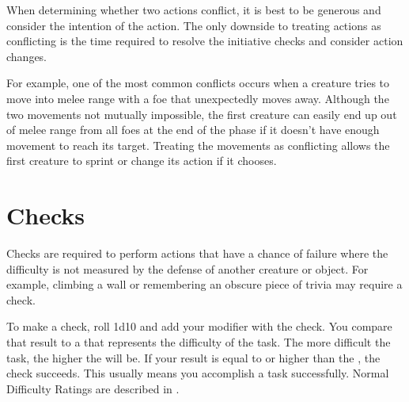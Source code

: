             When determining whether two actions conflict, it is best to be generous and consider the intention of the action.
            The only downside to treating actions as conflicting is the time required to resolve the initiative checks and consider action changes.

            For example, one of the most common conflicts occurs when a creature tries to move into melee range with a foe that unexpectedly moves away.
            Although the two movements not mutually impossible, the first creature can easily end up out of melee range from all foes at the end of the phase if it doesn't have enough movement to reach its target.
            Treating the movements as conflicting allows the first creature to sprint or change its action if it chooses.

\section{Checks}\label{Checks}
    Checks are required to perform actions that have a chance of failure where the difficulty is not measured by the defense of another creature or object.
    For example, climbing a wall or remembering an obscure piece of trivia may require a check.

    To make a check, roll 1d10 and add your modifier with the check.
    You compare that result to a  that represents the difficulty of the task.
    The more difficult the task, the higher the  will be.
    If your result is equal to or higher than the , the check succeeds.
    This usually means you accomplish a task successfully.
    Normal Difficulty Ratings are described in .

